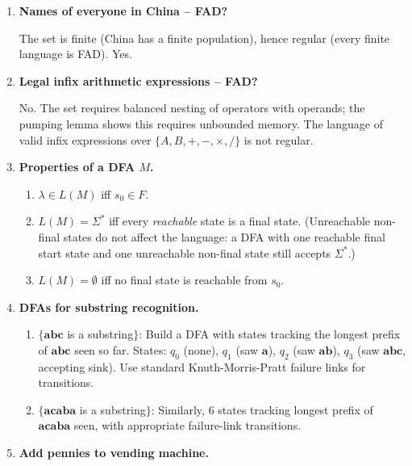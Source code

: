 \documentclass[11pt]{book}
\begin{document}
\begin{enumerate}[{1.}1.]
\item \textbf{Names of everyone in China -- FAD?}

The set is finite (China has a finite population), hence regular (every finite language is FAD). Yes.

\item \textbf{Legal infix arithmetic expressions -- FAD?}

No. The set requires balanced nesting of operators with operands; the pumping lemma shows this requires unbounded memory. The language of valid infix expressions over $\{A,B,+,-,\times,/\}$ is not regular.

\item \textbf{Properties of a DFA $M$.}

\begin{enumerate}
\item $\lambda\in L(M)$ iff $s_0\in F$.
\item $L(M)=\Sigma^*$ iff every \emph{reachable} state is a final state.
(Unreachable non-final states do not affect the language: a DFA with one reachable final start state and one unreachable non-final state still accepts $\Sigma^*$.)
\item $L(M)=\emptyset$ iff no final state is reachable from $s_0$.
\end{enumerate}

\item \textbf{DFAs for substring recognition.}

\begin{enumerate}
\item $\{\mathbf{abc}$ is a substring$\}$: Build a DFA with states tracking the longest prefix of $\mathbf{abc}$ seen so far. States: $q_0$ (none), $q_1$ (saw $\mathbf{a}$), $q_2$ (saw $\mathbf{ab}$), $q_3$ (saw $\mathbf{abc}$, accepting sink). Use standard Knuth-Morris-Pratt failure links for transitions.

\item $\{\mathbf{acaba}$ is a substring$\}$: Similarly, 6 states tracking longest prefix of $\mathbf{acaba}$ seen, with appropriate failure-link transitions.
\end{enumerate}

\item \textbf{Add pennies to vending machine.}


\end{enumerate}
\end{document}
